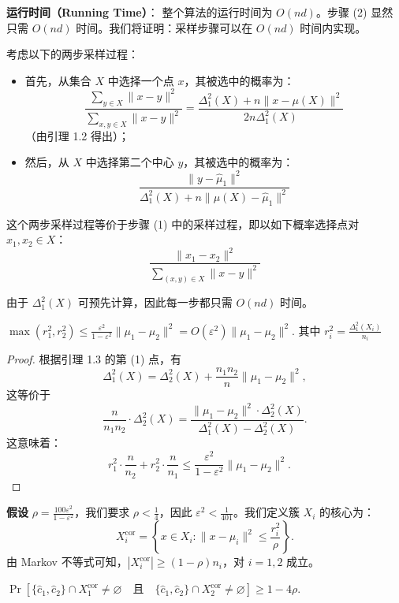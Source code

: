 \documentclass[lang=cn,newtx,10pt,scheme=chinese,chinesefont=nofont,citestyle=gb7714-2015, bibstyle=gb7714-2015]{elegantbook}
\begin{document}
\begin{refsection}
\textbf{运行时间（Running Time）}： 整个算法的运行时间为 $O(nd)$。步骤 (2) 显然只需 $O(nd)$ 时间。我们将证明：采样步骤可以在 $O(nd)$ 时间内实现。

考虑以下的两步采样过程：  
\begin{itemize}
    \item[(a)] 首先，从集合 $X$ 中选择一个点 $x$，其被选中的概率为：
    \[
    \frac{\sum_{y \in X} \|x - y\|^2}{\sum_{x, y \in X} \|x - y\|^2} 
    = \frac{\Delta_1^2(X) + n \|x - \mu(X)\|^2}{2n \Delta_1^2(X)}
    \]
    （由引理 1.2 得出）；
    
    \item[(b)] 然后，从 $X$ 中选择第二个中心 $y$，其被选中的概率为：
    \[
    \frac{\|y - \hat{\mu}_1\|^2}{\Delta_1^2(X) + n \|\mu(X) - \hat{\mu}_1\|^2}
    \]
\end{itemize}

这个两步采样过程等价于步骤 (1) 中的采样过程，即以如下概率选择点对 $x_1, x_2 \in X$：
\[
\frac{\|x_1 - x_2\|^2}{\sum_{(x, y) \in X} \|x - y\|^2}
\]

由于 $\Delta_1^2(X)$ 可预先计算，因此每一步都只需 $O(nd)$ 时间。

\begin{lemma}
    $\max(r_1^2, r_2^2) \leq \frac{\varepsilon^2}{1 - \varepsilon^2} \|\mu_1 - \mu_2\|^2 = O(\varepsilon^2) \|\mu_1 - \mu_2\|^2.$ 其中 $r_i^2 = \frac{\Delta_1^2(X_i)}{n_i}
$
\end{lemma}

\begin{proof}
    根据引理 1.3 的第 (1) 点，有  
\[
\Delta_1^2(X) = \Delta_2^2(X) + \frac{n_1 n_2}{n} \|\mu_1 - \mu_2\|^2,
\]  
这等价于  
\[
\frac{n}{n_1 n_2} \cdot \Delta_2^2(X) = \frac{\|\mu_1 - \mu_2\|^2 \cdot \Delta_2^2(X)}{\Delta_1^2(X) - \Delta_2^2(X)}.
\]  
这意味着：
\[
r_1^2 \cdot \frac{n}{n_2} + r_2^2 \cdot \frac{n}{n_1} \leq \frac{\varepsilon^2}{1 - \varepsilon^2} \|\mu_1 - \mu_2\|^2.
\quad 
\]
\end{proof}

\noindent \textbf{假设} $\rho = \frac{100 \varepsilon^2}{1 - \varepsilon^2}$，我们要求 $\rho < \frac{1}{4}$，因此 $\varepsilon^2 < \frac{1}{401}$。我们定义簇 $X_i$ 的核心为：
\[
X_i^{\text{cor}} = \left\{ x \in X_i : \|x - \mu_i\|^2 \leq \frac{r_i^2}{\rho} \right\}.
\]  
由 Markov 不等式可知，$\left|X_i^{\text{cor}}\right| \geq (1 - \rho)n_i$，对 $i = 1, 2$ 成立。

\begin{lemma}
    $\Pr\left[\{\hat{c}_1, \hat{c}_2\} \cap X_1^{\text{cor}} \neq \varnothing \quad \text{且} \quad \{\hat{c}_1, \hat{c}_2\} \cap X_2^{\text{cor}} \neq \varnothing \right] \geq 1 - 4\rho.$
\end{lemma}


\end{refsection}
\end{document}

